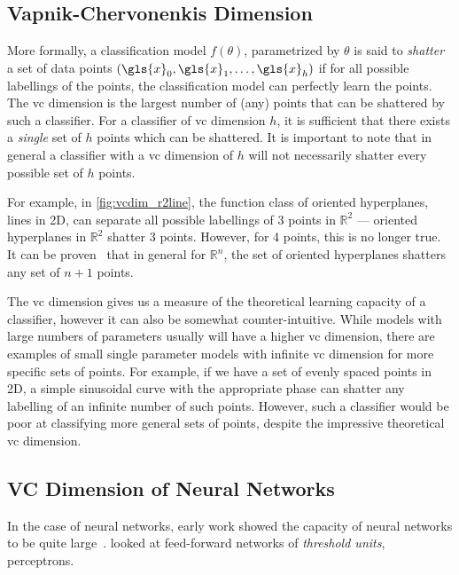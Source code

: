 \documentclass[thesis]{subfiles}
\begin{document}
    \subsection{Vapnik-Chervonenkis Dimension}
    More formally, a classification model $f(\theta)$, parametrized by $\theta$ is said to \emph{shatter} a set of data points $(\gls{x}_0, \gls{x}_1, \ldots, \gls{x}_h)$ if for all possible labellings of the points, the classification model can perfectly learn the points. The \gls{vc} dimension is the largest number of (any) points that can be shattered by such a classifier. For a classifier of \gls{vc} dimension $h$, it is sufficient that there exists a \emph{single} set of $h$ points which can be shattered. It is important to note that in general a classifier with a \gls{vc} dimension of $h$ will not necessarily shatter every possible set of $h$ points. 
    
    For example, in \cref{fig:vcdim_r2line}, the function class of oriented hyperplanes, \ie lines in 2D, can separate all possible labellings of 3 points in $\mathbb{R}^2$ --- oriented hyperplanes in $\mathbb{R}^2$ shatter 3 points. However, for 4 points, this is no longer true. It can be proven~\citep{burges1998tutorial} that in general for $\mathbb{R}^n$, the set of oriented hyperplanes shatters any set of $n+1$ points.

    The \gls{vc} dimension gives us a measure of the theoretical learning capacity of a classifier, however it can also be somewhat counter-intuitive. While models with large numbers of parameters usually will have a higher \gls{vc} dimension, there are examples of small single parameter models with infinite \gls{vc} dimension for more specific sets of points. For example, if we have a set of evenly spaced points in 2D, a simple sinusoidal curve with the appropriate phase can shatter any labelling of an infinite number of such points. However, such a classifier would be poor at classifying more general sets of points, despite the impressive theoretical \gls{vc} dimension.
    
    \subsection{VC Dimension of Neural Networks}\label{vcdim}
    In the case of neural networks, early work showed the capacity of neural networks to be quite large~\citep{hornik89a,baum1989size}. \citet{baum1989size} looked at feed-forward networks of \emph{threshold units}, \ie perceptrons. %
    
\end{document}

